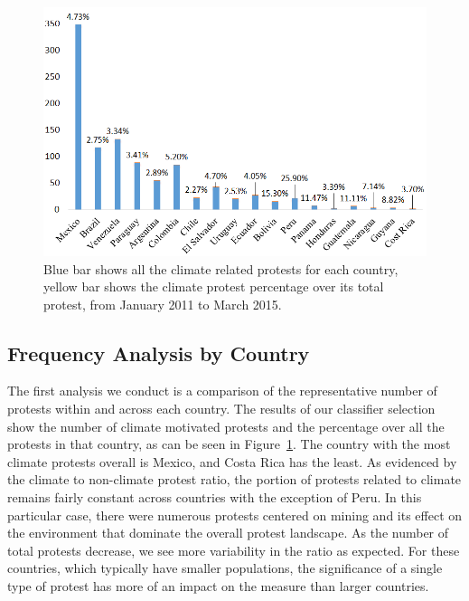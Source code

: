 \begin{figure}[htb]
\centerline
{\includegraphics[width=.8\textwidth]{figures/month-country-protest3}}
\caption{Blue bar shows all the climate related protests for each country, yellow bar shows the climate protest percentage over its total protest, from January 2011 to March 2015.}
\label{month_percentage}
\end{figure}

\subsection{Frequency Analysis by Country}
The first analysis we conduct is a comparison of the representative number of protests within and across each country.
The results of our classifier selection show the number of climate motivated protests and the percentage over all the protests in that country, as can be seen in Figure~\ref{month_percentage}.
The country with the most climate protests overall is Mexico, and Costa Rica has the least.
As evidenced by the climate to non-climate protest ratio, the portion of protests related to climate remains fairly constant across countries with the exception of Peru.
In this particular case, there were numerous protests centered on mining and its effect on the environment that dominate the overall protest landscape.
As the number of total protests decrease, we see more variability in the ratio as expected.
For these countries, which typically have smaller populations, the significance of a single type of protest has more of an impact on the measure than larger countries.


